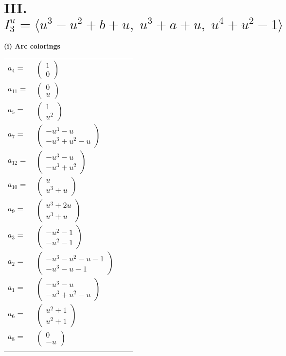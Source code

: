 \documentclass[1p]{elsarticle_modified}
\theoremstyle{definition}
\begin{document}
\centering \section*{III. $I^u_{3}= \langle u^3- u^2+b+u,\;u^3+a+u,\;u^4+u^2-1 \rangle$}
\flushleft \textbf{(i) Arc colorings}\\
\begin{tabular}{m{7pt} m{180pt} m{7pt} m{180pt} }
\flushright $a_{4}=$&$\begin{pmatrix}1\\0\end{pmatrix}$ \\
\flushright $a_{11}=$&$\begin{pmatrix}0\\u\end{pmatrix}$ \\
\flushright $a_{5}=$&$\begin{pmatrix}1\\u^2\end{pmatrix}$ \\
\flushright $a_{7}=$&$\begin{pmatrix}- u^3- u\\- u^3+u^2- u\end{pmatrix}$ \\
\flushright $a_{12}=$&$\begin{pmatrix}- u^3- u\\- u^3+u^2\end{pmatrix}$ \\
\flushright $a_{10}=$&$\begin{pmatrix}u\\u^3+u\end{pmatrix}$ \\
\flushright $a_{9}=$&$\begin{pmatrix}u^3+2 u\\u^3+u\end{pmatrix}$ \\
\flushright $a_{3}=$&$\begin{pmatrix}- u^2-1\\- u^2-1\end{pmatrix}$ \\
\flushright $a_{2}=$&$\begin{pmatrix}- u^3- u^2- u-1\\- u^3- u-1\end{pmatrix}$ \\
\flushright $a_{1}=$&$\begin{pmatrix}- u^3- u\\- u^3+u^2- u\end{pmatrix}$ \\
\flushright $a_{6}=$&$\begin{pmatrix}u^2+1\\u^2+1\end{pmatrix}$ \\
\flushright $a_{8}=$&$\begin{pmatrix}0\\- u\end{pmatrix}$\\&\end{tabular}
\end{document}
